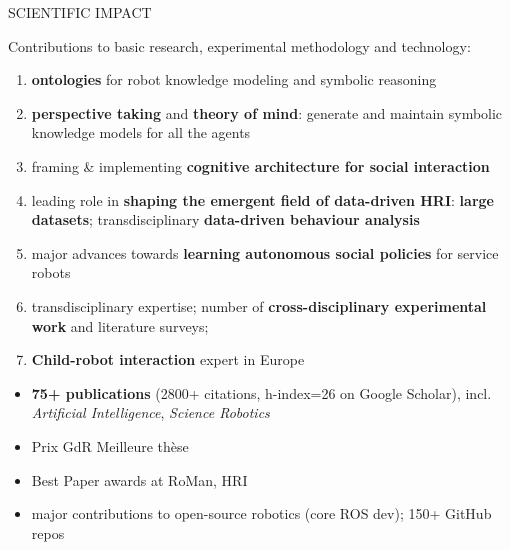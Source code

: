 \documentclass[xcolor=table]{beamer}
\begin{document}
\begin{frame}{SCIENTIFIC IMPACT}

    Contributions to basic research, experimental methodology and technology:

    {\scriptsize
    \begin{enumerate}
        \item \textbf{ontologies} for robot knowledge modeling and symbolic
            reasoning
        \item \textbf{perspective taking} and \textbf{theory of mind}: generate and
            maintain symbolic knowledge models for all the agents
        \item framing \& implementing \textbf{cognitive architecture for social interaction}
        \item leading role in \textbf{shaping the emergent field of data-driven
            HRI}: \textbf{large datasets}; transdisciplinary \textbf{data-driven behaviour analysis} 
        \item major advances towards \textbf{learning autonomous social policies} for service robots
        \item transdisciplinary expertise; number of \textbf{cross-disciplinary
            experimental work} and literature surveys;
        \item \textbf{Child-robot interaction} expert in Europe
    \end{enumerate}
    }

    {\scriptsize
    \begin{itemize}
        \item \textbf{75+ publications} (2800+ citations, h-index=26 on Google Scholar), incl. \emph{Artificial Intelligence},
            \emph{Science Robotics}
        \item Prix GdR Meilleure thèse
        \item Best Paper awards at RoMan, HRI
        \item major contributions to open-source robotics (core ROS dev); 150+ GitHub repos
    \end{itemize}
    }
\end{frame}
\end{document}
